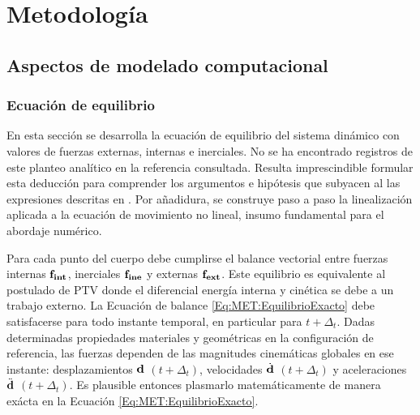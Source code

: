 \chapter{Metodología}
\linenumbers
\section{Aspectos de modelado computacional}
\subsection{Ecuación de equilibrio}

En esta sección se desarrolla la ecuación de equilibrio del sistema dinámico con valores de fuerzas externas, internas e inerciales. No se ha encontrado registros de este planteo analítico en la referencia consultada. Resulta imprescindible formular esta deducción para comprender los argumentos e hipótesis que subyacen al las expresiones descritas en \citep{Le2014}. Por añadidura, se construye paso a paso la linealización aplicada a la ecuación de movimiento no lineal, insumo fundamental para el abordaje numérico. 

Para cada punto del cuerpo debe cumplirse el balance vectorial entre fuerzas internas $\bf{f}_{int}$, inerciales $\bf{f}_{ine}$ y externas $\bf{f}_{ext}$. Este equilibrio es equivalente al postulado de PTV donde el diferencial energía interna y cinética se debe a un trabajo externo. La Ecuación de balance \eqref{Eq:MET:EquilibrioExacto} debe satisfacerse para todo instante temporal, en particular para $t+\Delta_t$. Dadas determinadas propiedades materiales y geométricas en la configuración de referencia, las fuerzas dependen de las magnitudes cinemáticas globales en ese instante: desplazamientos $\bf{d}$ $(t+\Delta_t)$, velocidades $\dot{\bf{d}}$ $(t+\Delta_t)$ y aceleraciones $\ddot{\bf{d}}$ $(t+\Delta_t)$. Es plausible entonces plasmarlo matemáticamente de manera exácta en la Ecuación \eqref{Eq:MET:EquilibrioExacto}.

